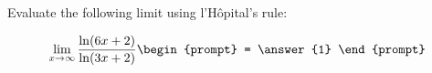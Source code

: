 \documentclass{ximera}
\author{Steven Gubkin}
\begin{document}
\begin{exercise}

Evaluate the following limit using l'H\^{o}pital's rule:

\[
\lim_{x \to \infty} \frac{\ln(6x+2)}{\ln(3x+2)} \begin{prompt} = \answer{1} \end{prompt}
\]

\end{exercise}
\end{document}
